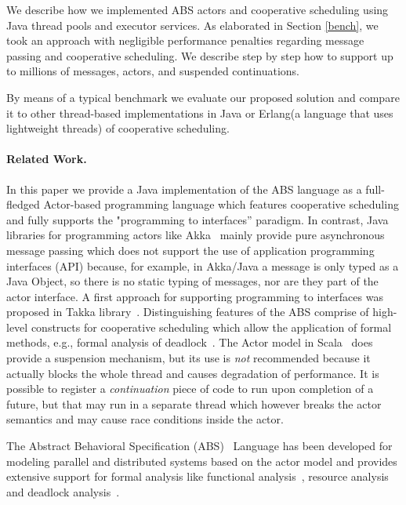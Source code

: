 We describe how we implemented ABS actors and cooperative scheduling using Java thread pools and executor services.  
As elaborated in Section \ref{bench}, we took an approach with negligible performance penalties regarding message passing and cooperative scheduling. 
We describe step by step how to support up to millions of messages, actors, and suspended continuations.


By means of a typical benchmark we evaluate our proposed solution and compare it
to other thread-based implementations in Java or Erlang(a language that uses lightweight threads) of cooperative scheduling.


\paragraph{Related Work.} 
In this paper we provide a Java implementation of the ABS language as a full-fledged Actor-based programming language which features cooperative scheduling and fully supports the "programming to interfaces'' paradigm. 
In contrast, Java libraries for programming actors like Akka~\cite{Akka} mainly provide pure asynchronous message passing which does not support the use of application programming interfaces (API) because, for example, in Akka/Java a message is only typed as a Java Object, so there is no static typing of messages, nor are they part of the actor interface.  A first approach for supporting programming to interfaces was proposed in Takka library~\cite{takka}. 
Distinguishing features of the ABS comprise of high-level constructs for cooperative scheduling which allow the application of formal methods, e.g.,
formal analysis of deadlock~\cite{deadlock}.
The Actor model in Scala~\cite{Scala} does provide a suspension mechanism, but its use is \emph{not} recommended because it actually blocks the whole thread and causes
degradation of performance.
It is possible to register a {\em continuation} piece of code to run upon completion of a future, but that may run in a separate thread which however breaks the actor semantics and may cause race conditions inside the actor.

The Abstract Behavioral Specification (ABS)~\cite{abs} Language has been developed for modeling parallel and distributed systems based on the actor model and provides extensive support for formal analysis like functional analysis~\cite{KeY}, resource analysis~\cite{saco} and deadlock analysis~\cite{dead}. 


